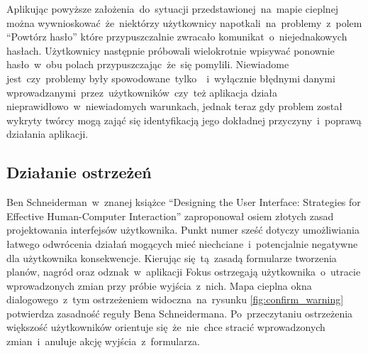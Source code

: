 Aplikując powyższe założenia~do~sytuacji przedstawionej~na~mapie cieplnej można wywnioskować~że~niektórzy użytkownicy napotkali~na~problemy~z~polem ``Powtórz hasło'' które przypuszczalnie zwracało komunikat~o~niejednakowych hasłach. Użytkownicy następnie próbowali wielokrotnie wpisywać ponownie hasło~w~obu polach przypuszczając~że~się pomylili. Niewiadome jest~czy~problemy były spowodowane~tylko~~i~wyłącznie błędnymi danymi wprowadzanymi~przez~użytkowników~czy~też aplikacja działa nieprawidłowo~w~niewiadomych warunkach, jednak teraz gdy problem został wykryty twórcy mogą zająć się identyfikacją jego dokładnej przyczyny~i~poprawą działania aplikacji.

\bigskip
{}

\subsection{Działanie ostrzeżeń}
Ben Schneiderman~w~znanej książce ``Designing the User Interface: Strategies for Effective Human-Computer Interaction'' \cite{Designing_IU} zaproponował osiem złotych zasad projektowania interfejsów użytkownika. Punkt numer sześć dotyczy umożliwiania łatwego odwrócenia działań mogących mieć niechciane~i~potencjalnie negatywne dla użytkownika konsekwencje. Kierując się~tą~zasadą formularze tworzenia planów, nagród oraz odznak~w~aplikacji Fokus ostrzegają użytkownika~o~utracie wprowadzonych zmian przy próbie wyjścia~z~nich. Mapa cieplna okna dialogowego~z~tym ostrzeżeniem widoczna~na~rysunku \ref{fig:confirm_warning} potwierdza zasadność reguły Bena Schneidermana. Po~przeczytaniu ostrzeżenia większość użytkowników orientuje się~że~nie~chce stracić wprowadzonych zmian~i~anuluje akcję wyjścia~z~formularza.

\bigskip
{}
